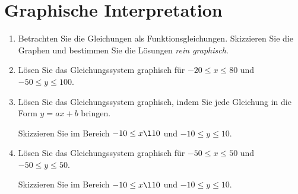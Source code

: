 \section{Graphische Interpretation}
\begin{enumerate}[label=\alph*)]
\item Betrachten Sie die Gleichungen als
 Funktionsgleichungen. Skizzieren Sie die Graphen und bestimmen Sie
 die Lösungen \textit{rein graphisch}.




\newpage
\item

Lösen Sie das Gleichungssystem graphisch für $-20 \le x \le 80$ und
$-50\le y \le 100$.




\newpage
\item
Lösen Sie das Gleichungssystem graphisch, indem Sie jede Gleichung in
die Form $y=ax+b$ bringen.

Skizzieren Sie im Bereich $-10 \le x \l 10$ und $-10 \le y \le 10$.



\newpage

\item
Lösen Sie das Gleichungssystem graphisch für $-50 \le x \le 50$ und
$-50 \le y \le 50$.


Skizzieren Sie im Bereich $-10 \le x \l 10$ und $-10 \le y \le 10$.


\newpage

\end{enumerate}


